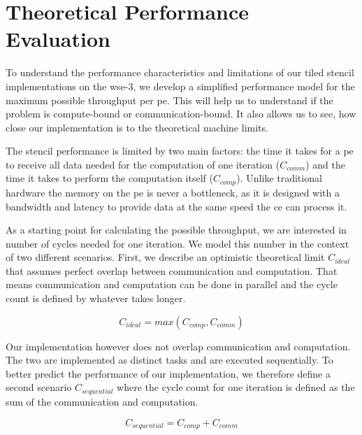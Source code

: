 \chapter{Theoretical Performance Evaluation}
\label{sec:theory_performance}
To understand the performance characteristics and limitations of our tiled stencil implementations on the \ac{wse}-3, we develop a simplified performance model for the maximum possible throughput per \ac{pe}. This will help us to understand if the problem is compute-bound or communication-bound. It also allows us to see, how close our implementation is to the theoretical machine limits.

The stencil performance is limited by two main factors: the time it takes for a \ac{pe} to receive all data needed for the computation of one iteration ($C_{comm}$) and the time it takes to perform the computation itself ($C_{comp}$). Unlike traditional hardware the memory on the \ac{pe} is never a bottleneck, as it is designed with a bandwidth and latency to provide data at the same speed the \ac{ce} can process it.

As a starting point for calculating the possible throughput, we are interested in number of cycles needed for one iteration. We model this number in the context of two different scenarios. First, we describe an optimistic theoretical limit $C_{ideal}$ that assumes perfect overlap between communication and computation. That means communication and computation can be done in parallel and the cycle count is defined by whatever takes longer.

\begin{equation}
    \label{eq:c_ideal}
    C_{ideal} = max\left(C_{comp}, C_{comm}\right)
\end{equation}


Our implementation however does not overlap communication and computation. The two are implemented as distinct tasks and are executed sequentially. To better predict the performance of our implementation, we therefore define a second scenario $C_{sequential}$ where the cycle count for one iteration is defined as the sum of the communication and computation.

\begin{equation}
    \label{eq:c_sequential}
    C_{sequential} = C_{comp} + C_{comm}
\end{equation}

